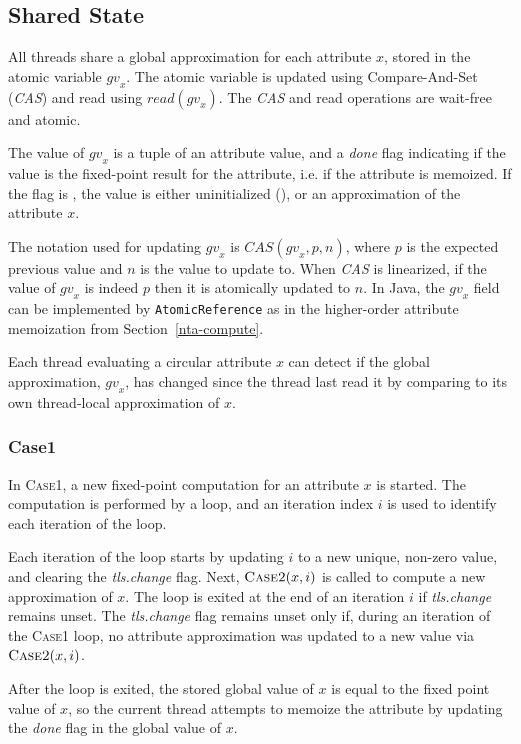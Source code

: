 {\subsection{Shared State}

All threads share a global approximation for each attribute $x$, stored in the
atomic variable $\mathit{gv}_x$. The atomic variable is
updated using Compare-And-Set (\emph{CAS})
and read using $read(\mathit{gv}_x)$.
The \emph{CAS} and read operations are wait-free and atomic.

The value of $\mathit{gv}_x$ is a tuple of an attribute value,
and a \emph{done} flag indicating if the value is the
fixed-point result for the attribute, i.e. if the attribute is memoized.
If the flag is \false, the value is either
uninitialized (\none), or an approximation of the attribute $x$.

The notation used for updating $\mathit{gv}_x$ is $\mathit{CAS}(\mathit{gv}_x, p, n)$,
where $p$ is the expected previous
value and $n$ is the value to update to.
When \emph{CAS} is linearized, if the value of $\mathit{gv}_x$ is indeed $p$ then it is atomically
updated to $n$.  In Java, the $\mathit{gv}_x$ field can be implemented by \verb'AtomicReference' as in the
higher-order attribute memoization from Section~\ref{nta-compute}.

Each thread evaluating a circular attribute $x$ can detect if the global approximation, $\mathit{gv}_x$, has
changed since the thread last read it by comparing to its own thread-local approximation of $x$.


\subsubsection{Case1}

In \textsc{Case1}, a new fixed-point computation for an attribute $x$ is started.
The computation is performed by a loop, and an iteration index $i$ is used to identify each
iteration of the loop.

Each iteration of the loop starts by updating $i$ to a new unique, non-zero value,
and clearing the \emph{tls.change} flag.  Next,
$\textsc{Case2}(x, i)$ is called to compute a new approximation of $x$.  The loop is exited
at the end of an iteration $i$ if \emph{tls.change} remains unset.
The \emph{tls.change} flag remains unset only if,
during an iteration of the \textsc{Case1} loop,
no attribute approximation was updated to a new value via $\textsc{Case2}(x, i)$.

After the loop is exited, the stored global value of $x$ is equal to the fixed point value of $x$,
so the current thread attempts to memoize the attribute by updating the \emph{done} flag in the
global value of $x$.

}
